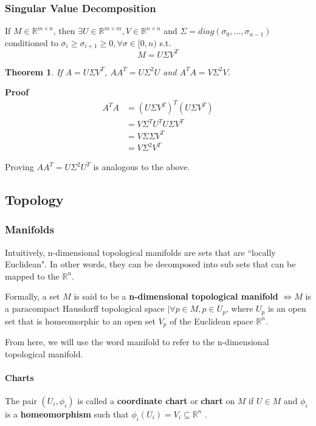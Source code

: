 \documentclass[12pt]{article}
\newtheorem{theorem}{Theorem}[section]
\begin{document}
\subsubsection{Singular Value Decomposition}
\label{sec:svd}
If $M \in \mathbb{R}^{m \times n}$, then $\exists U \in \mathbb{R}^{m \times m}, V \in \mathbb{R}^{n \times n}$ and $\Sigma =  diag(\sigma_0, \dots, \sigma_{n-1})$ conditioned to $\sigma_i \ge \sigma_{i+1} \ge 0, \forall \sigma \in [0, n)$ s.t. \cite{gan2008}
$$M = U\Sigma V^T$$

\begin{theorem}
	\label{th:svd-aat}
	If $A = U \Sigma V^T$, $AA^T = U \Sigma^2 U$ and $A^TA = V \Sigma^2 V$.
\end{theorem}
\textbf{Proof}
\begin{align*}
	A^TA &= (U\Sigma V^T)^T(U\Sigma V^T) \\
	&= V \Sigma^T U^T U \Sigma V^T \\
	&= V \Sigma \Sigma V^T \\
	&= V \Sigma^2 V^T
\end{align*}

Proving $AA^T = U \Sigma^2 U^T$ is analogous to the above.

\subsection{Topology}
\subsubsection{Manifolds}

Intuitively, n-dimensional topological manifolds are sets that are ``locally Euclidean". \cite{lee2009} In other words, they can be decomposed into sub sets that can be mapped to the $\mathbb{R}^n$.

Formally, a set $M$ is said to be a \textbf{n-dimensional topological manifold} $\iff M$ is a paracompact Hausdorff topological space $\mid \forall p \in M, p \in U_p$, where $U_p$ is an open set that is homeomorphic to an open set $V_p$ of the Euclidean space $\mathbb{R}^n$. \cite{lee2009}

From here, we will use the word manifold to refer to the n-dimensional topological manifold.

\paragraph{Charts}
The pair $(U_i, \phi_i)$ is called a \textbf{coordinate chart} or \textbf{chart} on $M$ if $U \in M$ and $\phi_i$ is a \textbf{homeomorphism} such that $\phi_i(U_i) = V_i \subseteq \mathbb{R}^n$ \cite{lee2012}.
\end{document}
